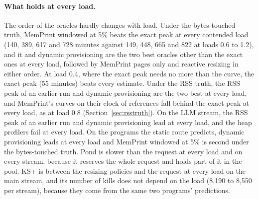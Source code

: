 \documentclass[11pt]{article}
\newcommand{\memprint}{MemPrint}
\newcommand{\secref}[1]{Section~\ref{#1}}
\begin{document}
\paragraph{What holds at every load.} The order of the oracles hardly changes with load. Under the
bytes-touched truth, \memprint{} windowed at 5\% beats the exact peak at every contended load (140, 389, 617 and
728 minutes against 149, 448, 665 and 822 at loads 0.6 to 1.2), and it and dynamic provisioning are the two best
oracles other than the exact ones at every load, followed by \memprint{} pages only and reactive resizing in either
order. At load 0.4, where the exact peak needs no more than the curve, the exact peak (55 minutes) beats every
estimate. Under the RSS truth, the RSS peak of an earlier run and dynamic provisioning are the two best at every
load, and \memprint{}'s curves on their clock of references fall behind the exact peak at every load, as at load 0.8
(\secref{sec:rsstruth}). On the LLM
stream, the RSS peak of an earlier run and dynamic provisioning lead at every load, and the heap profilers fail at
every load. On the programs the static route predicts, dynamic provisioning leads at every load and \memprint{}
windowed at 5\% is second under the bytes-touched truth. Pond is slower than the request at every load and on
every stream, because it reserves the whole request and holds part of it in the pool. KS+ is between the
resizing policies and the request at every load on the main stream, and its number of kills does not depend on the
load (8{,}190 to 8{,}550 per stream), because they come from the same two programs' predictions.
\end{document}
